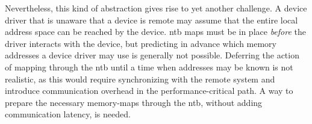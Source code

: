 


Nevertheless, this kind of abstraction gives rise to yet another challenge.
%
A device driver that is unaware that a device is remote may assume that the entire local address space can be reached by the device.
%
\Gls{ntb} maps must be in place \emph{before} the driver interacts with the device, but predicting in advance which memory addresses a device driver may use is generally not possible.
%
Deferring the action of mapping through the \gls{ntb} until a time when addresses may be known is not realistic, as this would require synchronizing with the remote system and introduce communication overhead in the performance-critical path.
%
A way to prepare the necessary memory-maps through the \gls{ntb}, without adding communication latency, is needed.

